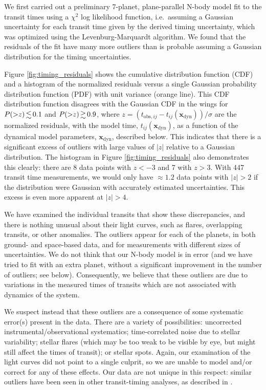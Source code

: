 \documentclass[fleqn,usenatbib]{mnras} %
\begin{document}
We first carried out a preliminary 7-planet, plane-parallel N-body model fit to the transit times using a $\chi^2$ log likelihood function, i.e.\ assuming a Gaussian uncertainty for each transit time given by the derived timing uncertainty, which was optimized using the Levenburg-Marquardt algorithm.
We found that the residuals of the fit have many more outliers than is probable assuming
a Gaussian distribution for the timing uncertainties.

Figure \ref{fig:timing_residuals} shows the cumulative distribution
function (CDF)
and a histogram of the normalized residuals versus a single Gaussian
probability distribution function (PDF) with unit variance (orange line).  
This CDF distribution function disagrees with the Gaussian CDF
in the wings for $P({>}z) \la 0.1$ and $P({>}z) \ga 0.9$,
where $z {=} (t_{\mathrm{obs},ij} {-} t_{ij}(\mathbf{x}_\mathrm{dyn}))/\sigma$ are the normalized residuals, with the model time, $t_{ij}(\mathbf{x}_\mathrm{dyn})$, as a function of the dynamical model parameters, $\mathbf{x}_\mathrm{dyn}$, described below.
This indicates that there is a significant excess of outliers with
large values of $\vert z\vert$
relative to a Gaussian distribution.  The histogram in Figure
\ref{fig:timing_residuals} also demonstrates this clearly:  there
are 8 data points with $z {<} -3$ and 7 with $z {>} 3$.  With 447
transit time measurements, we would only have $\approx 1.2$ data points
with $\vert z\vert {>} 2$ if the distribution were Gaussian with accurately estimated 
uncertainties.  This excess is even more apparent at 
$\vert z \vert {>} 4$. %

We have examined the individual transits that show these discrepancies,
and there is nothing unusual about their light curves, such as flares, 
overlapping transits, or other anomalies.  %
The outliers
appear for each of the planets, in both ground- and space-based data, 
and for measurements with different sizes of uncertainties.  We do
not think that our N-body model is in error (and we have tried to fit
with an extra planet, without a significant improvement in the number
of outliers; see below).  Consequently, we believe that these outliers
are due to variations in the measured times of transits which are not
associated with dynamics of the system.  

We suspect instead that these outliers
are a consequence of some systematic error(s) present in the data.  There are a variety
of possibilities:  uncorrected instrumental/observational systematics;
time-correlated noise due to stellar variability;  stellar flares (which
may be too weak to be visible by eye, but might still affect the
times of transit); or stellar spots.  Again, our examination of
the light curves did not point to a single culprit, so we are unable
to model and/or correct for any of these effects.  Our data are not unique in this respect:  similar outliers
have been seen in other transit-timing analyses, as described
in \citet{JontofHutter2016}.
\end{document}
